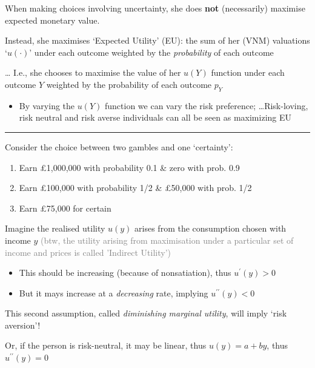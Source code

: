 \documentclass[]{article}
\providecommand{\tightlist}{%
  \setlength{\itemsep}{0pt}\setlength{\parskip}{0pt}}
\begin{document}
When making choices involving uncertainty, she does \textbf{not} (necessarily) maximise expected monetary value.

Instead, she maximises `Expected Utility' (EU): the sum of her (VNM) valuations `\(u(\cdot)\)' under each outcome weighted by the \emph{probability} of each outcome

\ldots{} I.e., she chooses to maximise the value of her \(u(Y)\) function under each outcome \(Y\) weighted by the probability of each outcome \(p_Y\)

\begin{itemize}
\tightlist
\item
  By varying the \(u(Y)\) function we can vary the risk preference; \ldots{}Risk-loving, risk neutral and risk averse individuals can all be seen as maximizing EU
\end{itemize}

\begin{center}\rule{0.5\linewidth}{\linethickness}\end{center}

Consider the choice between two gambles and one `certainty':

\begin{enumerate}
\def\labelenumi{\arabic{enumi}.}
\tightlist
\item
  Earn £1,000,000 with probability 0.1 \& zero with prob. 0.9
\item
  Earn £100,000 with probability 1/2 \& £50,000 with prob. 1/2
\item
  Earn £75,000 for certain
\end{enumerate}

\bigskip

Imagine the realised utility \(u(y)\) arises from the consumption chosen with income \(y\) \textcolor{gray}{(btw, the utility arising from maximisation under a particular set of income and prices is called 'Indirect Utility')}

\begin{itemize}
\tightlist
\item
  This should be increasing (because of nonsatiation), thus \(u^\prime (y)>0\)
\item
  But it mays increase at a \emph{decreasing} rate, implying \(u^{\prime \prime}(y)< 0\)
\end{itemize}

This second assumption, called \emph{diminishing marginal utility}, will imply `risk aversion'!

Or, if the person is risk-neutral, it may be linear, thus \(u(y) = a + by\), thus \(u^{\prime \prime}(y)=0\)
\end{document}
